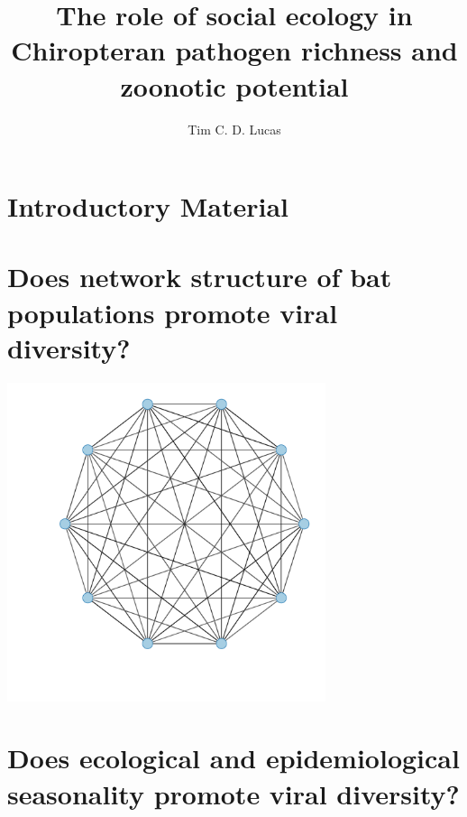 \documentclass[11pt,phd,a4paper,twoside]{pretty_thesis}
\title{The role of social ecology in Chiropteran pathogen richness and zoonotic potential}
\author{Tim C. D. Lucas}
\begin{document}
\nobibliography*





\chapter{Introductory Material}
\label{chapterlabel1}


\chapter[Network structure and diversity]{Does network structure of bat populations promote viral diversity?}
\label{chapterlabel2}
\begin{center}
\includegraphics[width=0.7\textwidth]{imgs/fullyConnected.pdf}
\end{center}



\chapter[Seasonality and diversity]{Does ecological and epidemiological seasonality promote viral diversity?}
\label{chapterlabel3}

\end{document}

